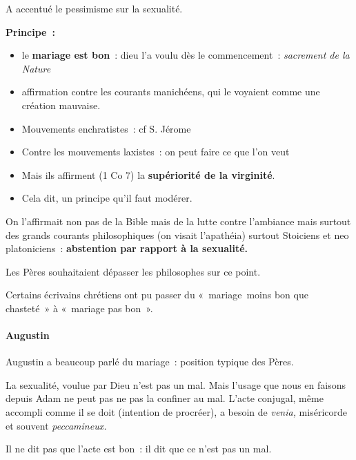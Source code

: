 A accentué le pessimisme sur la sexualité.

\textbf{Principe~:}

\begin{itemize}
\item
  le \textbf{mariage est bon}~: dieu l'a voulu dès le commencement~:
  \emph{sacrement de la Nature}
\item
   
  affirmation contre les courants manichéens, qui le voyaient comme une
  création mauvaise.
   
\item
   
  Mouvements enchratistes~: cf S. Jérome
   
\item
   
  Contre les mouvements laxistes~: on peut faire ce que l'on veut
   
\item
  Mais ils affirment (1 Co 7) la \textbf{supériorité de la virginité}.
\item
   
  Cela dit, un principe qu'il faut modérer.
   
\end{itemize}

On l'affirmait non pas de la Bible mais de la lutte contre l'ambiance
mais surtout des grands courants philosophiques (on visait l'apathéia)
surtout Stoiciens et neo platoniciens~: \textbf{abstention par rapport à
la sexualité.}

Les Pères souhaitaient dépasser les philosophes sur ce point.

Certains écrivains chrétiens ont pu passer du «~mariage~moins bon que
chasteté~» à «~mariage pas bon~».

\hypertarget{augustin-1}{%
\paragraph{Augustin}\label{augustin-1}}

Augustin a beaucoup parlé du mariage~: position typique des Pères.

La sexualité, voulue par Dieu n'est pas un mal. Mais l'usage que nous en
faisons depuis Adam ne peut pas ne pas la confiner au mal. L'acte
conjugal, même accompli comme il se doit (intention de procréer), a
besoin de \emph{venia,} miséricorde et souvent \emph{peccamineux.}

Il ne dit pas que l'acte est bon~: il dit que ce n'est pas un mal.

